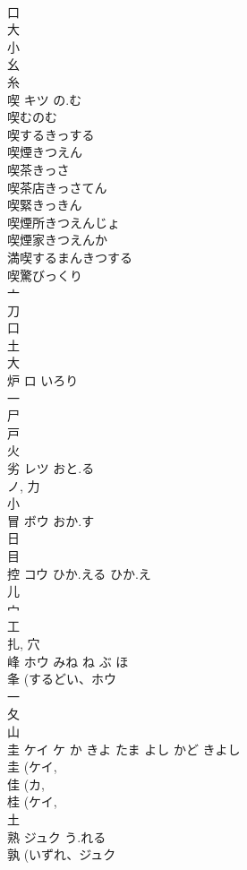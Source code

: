 \documentclass[8pt]{extreport}
\begin{document}
\begin{CJK}{UTF8}{min}
\\	口 
\\	大 
\\	小 
\\	幺 
\\	糸 
\\	喫	キツ	の.む	
\\	喫むのむ
\\	喫するきっする
\\	喫煙きつえん
\\	喫茶きっさ
\\	喫茶店きっさてん
\\	喫緊きっきん
\\	喫煙所きつえんじょ
\\	喫煙家きつえんか
\\	満喫するまんきつする
\\	喫驚びっくり
\\	亠 
\\	刀 
\\	口 
\\	土 
\\	大 
\\	炉	ロ	いろり	
\\	一 
\\	尸 
\\	戸 
\\	火 
\\	劣	レツ	おと.る	
\\	ノ, 力 
\\	小 
\\	冒	ボウ	おか.す	
\\	日 
\\	目 
\\	控	コウ	ひか.える ひか.え	
\\	儿 
\\	宀 
\\	工 
\\	扎, 穴 
\\	峰	ホウ	みね ね ぶ ほ	
\\	夆 (するどい、ホウ 
\\	一 
\\	夂 
\\	山 
\\	圭	ケイ ケ	か きよ たま よし かど きよし	
\\	圭 (ケイ, 
\\	佳 (カ, 
\\	桂 (ケイ, 
\\	土 
\\	熟	ジュク	う.れる	
\\	孰 (いずれ、ジュク 

\end{CJK}
\end{document}
